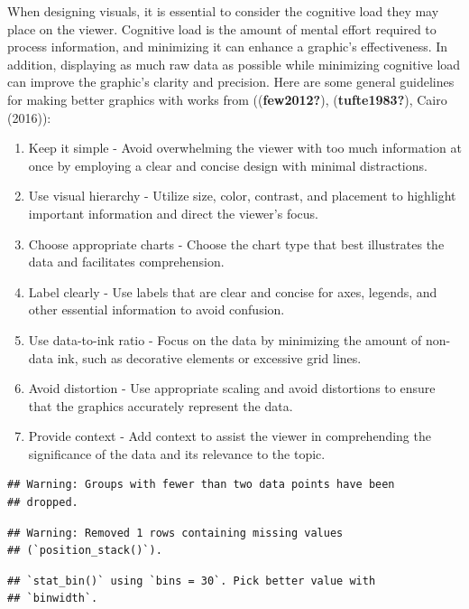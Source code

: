 \documentclass[print]{nuthesis}
\begin{document}
When designing visuals, it is essential to consider the cognitive load they may place on the viewer.
Cognitive load is the amount of mental effort required to process information, and minimizing it can enhance a graphic's effectiveness.
In addition, displaying as much raw data as possible while minimizing cognitive load can improve the graphic's clarity and precision.
Here are some general guidelines for making better graphics with works from ((\textbf{few2012?}), (\textbf{tufte1983?}), Cairo (2016)):

\begin{enumerate}
\def\labelenumi{\arabic{enumi}.}
\item
  Keep it simple - Avoid overwhelming the viewer with too much information at once by employing a clear and concise design with minimal distractions.
\item
  Use visual hierarchy - Utilize size, color, contrast, and placement to highlight important information and direct the viewer's focus.
\item
  Choose appropriate charts - Choose the chart type that best illustrates the data and facilitates comprehension.
\item
  Label clearly - Use labels that are clear and concise for axes, legends, and other essential information to avoid confusion.
\item
  Use data-to-ink ratio - Focus on the data by minimizing the amount of non-data ink, such as decorative elements or excessive grid lines.
\item
  Avoid distortion - Use appropriate scaling and avoid distortions to ensure that the graphics accurately represent the data.
\item
  Provide context - Add context to assist the viewer in comprehending the significance of the data and its relevance to the topic.
\end{enumerate}

\begin{verbatim}
## Warning: Groups with fewer than two data points have been
## dropped.
\end{verbatim}

\begin{verbatim}
## Warning: Removed 1 rows containing missing values
## (`position_stack()`).
\end{verbatim}

\begin{verbatim}
## `stat_bin()` using `bins = 30`. Pick better value with
## `binwidth`.
\end{verbatim}
\end{document}
